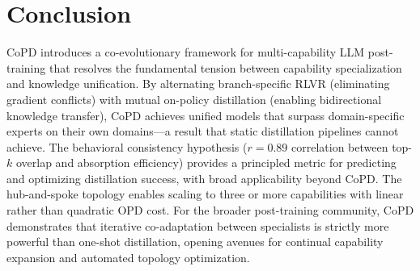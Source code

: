 \documentclass[11pt]{article}
\begin{document}
\section{Conclusion}

CoPD introduces a co-evolutionary framework for multi-capability LLM post-training that resolves the fundamental tension between capability specialization and knowledge unification. By alternating branch-specific RLVR (eliminating gradient conflicts) with mutual on-policy distillation (enabling bidirectional knowledge transfer), CoPD achieves unified models that surpass domain-specific experts on their own domains---a result that static distillation pipelines cannot achieve. The behavioral consistency hypothesis ($r = 0.89$ correlation between top-$k$ overlap and absorption efficiency) provides a principled metric for predicting and optimizing distillation success, with broad applicability beyond CoPD. The hub-and-spoke topology enables scaling to three or more capabilities with linear rather than quadratic OPD cost. For the broader post-training community, CoPD demonstrates that iterative co-adaptation between specialists is strictly more powerful than one-shot distillation, opening avenues for continual capability expansion and automated topology optimization.
\end{document}

